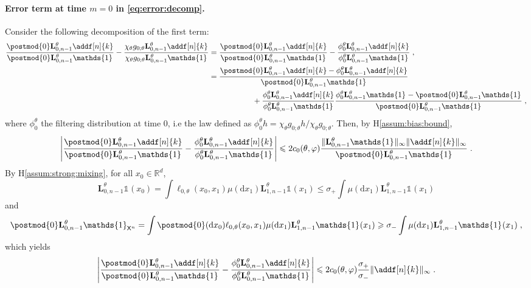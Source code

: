 \documentclass{article}
\newcommand{\uksymbol}{\ell}
\newcommand{\ud}[1]{\uksymbol_{#1}}
\newcommand{\1}{\mathbbm{1}}
\newcommand{\uk}[1]{\mathbf{L}_{#1}}
\newcommand{\Xset}{\mathsf{X}}
\newcommand{\md}[1]{g_{#1}}
\newcommand{\parvec}{\theta}
\def\1{\mathds{1}}
\newcommand{\rmd}{\ensuremath{\mathrm{d}}}
\newcommand{\eqsp}{\;}
\begin{document}
\paragraph{Error term at time $m=0$ in \eqref{eq:error:decomp}. }Consider the following decomposition of the first term:
\begin{align*}
\frac{\postmod{0} \uk{0, n - 1}^\theta \addf[n]{k}}{\postmod{0} \uk{0, n - 1}^\theta \1_{}} - \frac{\chi_\theta \md{0;\parvec}\uk{0, n - 1}^\theta \addf[n]{k}}{\chi_\theta\md{0;\parvec}\uk{0, n - 1}^\theta \1_{}} &= \frac{\postmod{0} \uk{0, n - 1}^\theta \addf[n]{k}}{\postmod{0} \uk{0, n - 1}^\theta \1_{}} - \frac{\phi^\theta_0\uk{0, n - 1}^\theta \addf[n]{k}}{\phi^\theta_0\uk{0, n - 1}^\theta \1_{}}\eqsp,\\
& = \frac{\postmod{0} \uk{0, n - 1}^\theta \addf[n]{k}-\phi^\theta_0\uk{0, n - 1}^\theta \addf[n]{k}}{\postmod{0} \uk{0, n - 1}^\theta \1_{}} \\
&\hspace{2cm}+  \frac{\phi^\theta_0\uk{0, n - 1}^\theta \addf[n]{k}}{\phi^\theta_0\uk{0, n - 1}^\theta \1_{}}\frac{\phi^\theta_0\uk{0, n - 1}^\theta \1_{} - \postmod{0} \uk{0, n - 1}^\theta \1_{}}{\postmod{0} \uk{0, n - 1}^\theta \1_{}} \eqsp,
\end{align*}
where $\phi^\theta_0$ the filtering distribution at time $0$, i.e the law defined as  $\phi^\theta_0h= \chi_\theta \md{0;\parvec}h/\chi_\theta \md{0;\parvec}$. Then, by H\ref{assum:bias:bound},
$$
\left|\frac{\postmod{0} \uk{0, n - 1}^\theta \addf[n]{k}}{\postmod{0} \uk{0, n - 1}^\theta \1_{}} - \frac{\phi^\theta_0\uk{0, n - 1}^\theta \addf[n]{k}}{\phi^\theta_0\uk{0, n - 1}^\theta \1_{}}\right|\leqslant 2c_0(\theta,\varphi)\frac{\| \uk{0, n - 1}^\theta \1_{}\|_\infty\|\addf[n]{k}\|_\infty}{\postmod{0} \uk{0, n - 1}^\theta \1_{}}\eqsp.
$$
By H\ref{assum:strong:mixing}, for all $x_0\in \mathbb{R}^d$,
$$
\uk{0, n - 1}^\theta \1_{}(x_0) = \int  \ud{0,\parvec}(x_0, x_{1})\mu(\rmd x_1)\uk{1, n - 1}^\theta \1_{}(x_1)\leqslant \sigma_+  \int \mu(\rmd x_1)\uk{1, n - 1}^\theta \1_{}(x_1)
$$
and 
$$
\postmod{0} \uk{0, n - 1}^\theta \1_{\Xset^n} = \int \postmod{0} (\rmd x_0)\ud{0,\parvec}(x_0, x_{1})\mu(\rmd x_1)\uk{1, n - 1}^\theta \1_{}(x_1)\geqslant \sigma_-  \int \mu(\rmd x_1)\uk{1, n - 1}^\theta \1_{}(x_1)\eqsp,
$$
which yields
$$
\left|\frac{\postmod{0} \uk{0, n - 1}^\theta \addf[n]{k}}{\postmod{0} \uk{0, n - 1}^\theta \1_{}} - \frac{\phi^\theta_0\uk{0, n - 1}^\theta \addf[n]{k}}{\phi^\theta_0\uk{0, n - 1}^\theta \1_{}}\right|\leqslant 2c_0(\theta,\varphi)\frac{\sigma_+}{\sigma_-}\|\addf[n]{k}\|_\infty\eqsp.
$$
\end{document}
